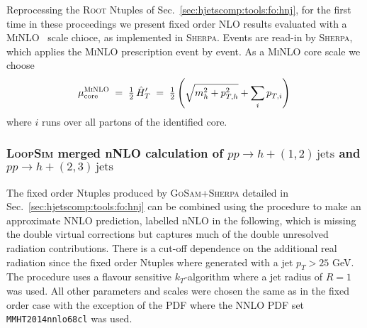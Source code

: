 Reprocessing the \textsc{Root} Ntuples of Sec.\ 
\ref{sec:hjetscomp:tools:fo:hnj}, for the first time in these 
proceedings we present fixed order NLO results evaluated with a
\textsc{MiNLO}~\cite{Hamilton:2012np} scale chioce, as implemented in
\textsc{Sherpa}. Events are read-in by \textsc{Sherpa}, which applies
the \textsc{MiNLO} prescription event by event. As a \textsc{MiNLO}
core scale we choose
\begin{equation} \label{eq:hthatprime}
  \mu_\text{core}^\text{\textsc{MiNLO}}
  \;=\;\tfrac{1}{2}\,\hat{H}^\prime_T
  \;=\;\tfrac{1}{2}\left(\sqrt{m_h^{2}+p_{T,h}^{2}}
       +\sum_{i}p_{T,i}^{}\right)\,
\end{equation}
where $i$ runs over all partons of the identified core.

\subsubsection{\textsc{LoopSim} merged nNLO calculation of 
               $pp\to h+(1,2)\,\text{jets}$ and $pp\to h+(2,3)\,\text{jets}$}
\label{sec:hjetscomp:tools:fo:hnjloopsim}

The fixed order Ntuples produced by \textsc{GoSam}{}+\textsc{Sherpa} 
detailed in Sec.\ \ref{sec:hjetscomp:tools:fo:hnj} can be combined 
using the \Loopsim \cite{Rubin:2010xp} procedure to make an approximate 
NNLO prediction, labelled nNLO in the following, which is missing the 
double virtual corrections but captures much of the double unresolved 
radiation contributions. There is a cut-off dependence on the additional 
real radiation since the fixed order Ntuples where generated with a jet 
$p_T>25$ GeV. The \Loopsim procedure uses a flavour sensitive 
$k_T$-algorithm where a jet radius of $R=1$ was used. All other 
parameters and scales were chosen the same as in the fixed order case 
with the exception of the PDF where the NNLO PDF set 
\texttt{MMHT2014nnlo68cl} was used.

